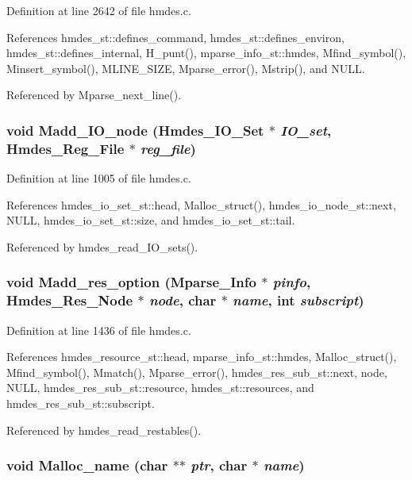 Definition at line 2642 of file hmdes.c.

References hmdes\_\-st::defines\_\-command, hmdes\_\-st::defines\_\-environ, hmdes\_\-st::defines\_\-internal, H\_\-punt(), mparse\_\-info\_\-st::hmdes, Mfind\_\-symbol(), Minsert\_\-symbol(), MLINE\_\-SIZE, Mparse\_\-error(), Mstrip(), and NULL.

Referenced by Mparse\_\-next\_\-line().
\subsubsection{\setlength{\rightskip}{0pt plus 5cm}void Madd\_\-IO\_\-node (\bf{Hmdes\_\-IO\_\-Set} $\ast$ {\em IO\_\-set}, \bf{Hmdes\_\-Reg\_\-File} $\ast$ {\em reg\_\-file})}\label{hmdes_8c_8dae87d00a072289aa6110f4a050834f}




Definition at line 1005 of file hmdes.c.

References hmdes\_\-io\_\-set\_\-st::head, Malloc\_\-struct(), hmdes\_\-io\_\-node\_\-st::next, NULL, hmdes\_\-io\_\-set\_\-st::size, and hmdes\_\-io\_\-set\_\-st::tail.

Referenced by hmdes\_\-read\_\-IO\_\-sets().
\subsubsection{\setlength{\rightskip}{0pt plus 5cm}void Madd\_\-res\_\-option (\bf{Mparse\_\-Info} $\ast$ {\em pinfo}, \bf{Hmdes\_\-Res\_\-Node} $\ast$ {\em node}, char $\ast$ {\em name}, int {\em subscript})}\label{hmdes_8c_c44837bb65e6328e99ae414c9ee8499c}




Definition at line 1436 of file hmdes.c.

References hmdes\_\-resource\_\-st::head, mparse\_\-info\_\-st::hmdes, Malloc\_\-struct(), Mfind\_\-symbol(), Mmatch(), Mparse\_\-error(), hmdes\_\-res\_\-sub\_\-st::next, node, NULL, hmdes\_\-res\_\-sub\_\-st::resource, hmdes\_\-st::resources, and hmdes\_\-res\_\-sub\_\-st::subscript.

Referenced by hmdes\_\-read\_\-restables().
\subsubsection{\setlength{\rightskip}{0pt plus 5cm}void Malloc\_\-name (char $\ast$$\ast$ {\em ptr}, char $\ast$ {\em name})}\label{hmdes_8c_94186a85a4489b80b7d305e6e13fec4c}




